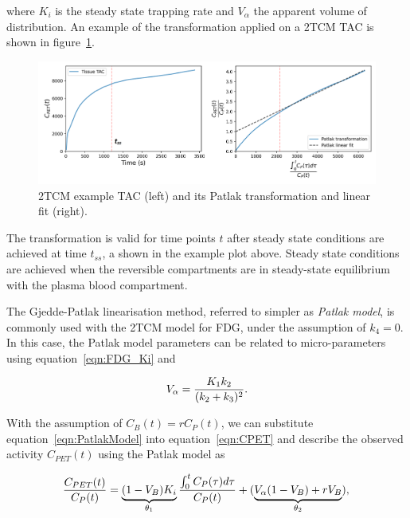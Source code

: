 where $K_i$ is the steady state trapping rate and $V_{\alpha}$ the apparent volume of distribution.
An example of the transformation applied on a 2TCM TAC is shown in figure~\ref{fig:2TCM_Patlak_Example}.
\begin{figure}[ht!]
	\includegraphics[width=1\textwidth]{2_Theory_Methods/figures/ExamplePatlak.png}
	\centering
	\caption{2TCM example TAC (left) and its Patlak transformation and linear fit (right).}
	\centering
	\label{fig:2TCM_Patlak_Example}
\end{figure}

The transformation is valid for time points $t$ after steady state conditions are achieved at time $t_{ss}$, a shown in the example plot above. Steady state conditions are achieved when the reversible compartments are in steady-state equilibrium with the plasma blood compartment. 

The Gjedde-Patlak linearisation method, referred to simpler as \textit{Patlak model}, is commonly used with the 2TCM model for FDG, under the assumption of $k_4=0$. In this case, the Patlak model parameters can be related to micro-parameters using equation~\ref{eqn:FDG_Ki} and 

\begin{equation} 
V_{\alpha}  = \frac{K_1 k_2}{(k_2+k_3)^2} \\ . \\ 
\end{equation}

With the assumption of $C_{B}(t) = r C_{P}(t)$, we can substitute equation~\ref{eqn:PatlakModel} into equation~\ref{eqn:CPET} and describe the observed activity $C_{PET}(t)$ using the Patlak model as

\begin{equation} 
\frac{C_{PET}(t)}{C_{P}(t)} = \underbrace{(1-V_{B})K_i}_{\theta_1} \frac{\int_{0}^{t} C_{P}(\tau) d\tau}{ C_{P}(t)} +  (\underbrace{V_{\alpha}(1-V_{B})+r V_{B}}_{\theta_2}) \\ , \\
\label{eqn:PatlakCPET}
\end{equation}

